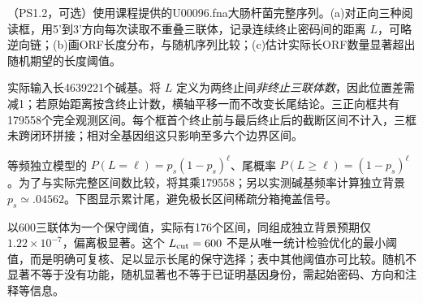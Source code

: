 \begin{exercise}
（PS1.2，可选）使用课程提供的U00096.fna大肠杆菌完整序列。(a)对正向三种阅读框，用5'到3'方向每次读取不重叠三联体，记录连续终止密码间的距离 $L$，可略逆向链；(b)画ORF长度分布，与随机序列比较；(c)估计实际长ORF数量显著超出随机期望的长度阈值。
\end{exercise}
\begin{solution}
实际输入长4639221个碱基。将 $L$ 定义为两终止间\emph{非终止三联体数}，因此位置差需减1；若原始距离按含终止计数，横轴平移一而不改变长尾结论。三正向框共有179558个完全观测区间。每个框首个终止前与最后终止后的截断区间不计入，三框未跨闭环拼接；相对全基因组这只影响至多六个边界区间。

等频独立模型的 $P(L=\ell)=p_s(1-p_s)^\ell$、尾概率 $P(L\ge\ell)=(1-p_s)^\ell$。为了与实际完整区间数比较，将其乘179558；另以实测碱基频率计算独立背景 $p_s\simeq.04562$。下图显示累计尾，避免极长区间稀疏分箱掩盖信号。
\begin{center}\end{center}
以600三联体为一个保守阈值，实际有176个区间，同组成独立背景预期仅 $1.22\times10^{-7}$，偏离极显著。这个 $L_{\rm cut}=600$ 不是从唯一统计检验优化的最小阈值，而是明确可复核、足以显示长尾的保守选择；表中其他阈值亦可比较。随机不显著不等于没有功能，随机显著也不等于已证明基因身份，需起始密码、方向和注释等信息。
\end{solution}

